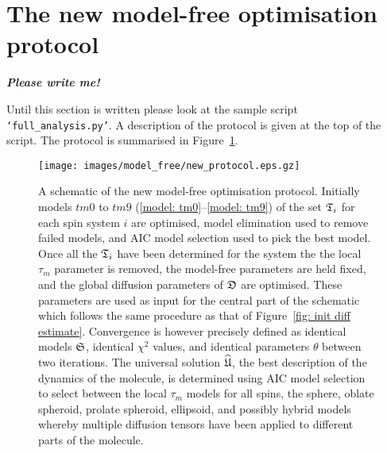 \section{The new model-free optimisation protocol}

\textbf{\textit{Please write me!}}

Until this section is written please look at the sample script \texttt{`full\_analysis.py'}.  A description of the protocol is given at the top of the script.  The protocol is summarised in Figure~\ref{fig: new protocol}.


\begin{figure}
\centerline{\texttt{[image: images/model\_free/new\_protocol.eps.gz]}}
\caption[A schematic of the new model-free optimisation protocol]{A schematic of the new model-free optimisation protocol.  Initially models $tm0$ to $tm9$ (\ref{model: tm0}--\ref{model: tm9}) of the set $\mathfrak{T}_i$ for each spin system $i$ are optimised, model elimination used to remove failed models, and AIC model selection used to pick the best model.  Once all the $\mathfrak{T}_i$ have been determined for the system the the local $\tau_m$ parameter is removed, the model-free parameters are held fixed, and the global diffusion parameters of $\mathfrak{D}$ are optimised.  These parameters are used as input for the central part of the schematic which follows the same procedure as that of Figure~\ref{fig: init diff estimate}.  Convergence is however precisely defined as identical models $\mathfrak{S}$, identical $\chi^2$ values, and identical parameters $\theta$ between two iterations.  The universal solution $\widehat{\mathfrak{U}}$, the best description of the dynamics of the molecule, is determined using AIC model selection to select between the local $\tau_m$ models for all spins, the sphere, oblate spheroid, prolate spheroid, ellipsoid, and possibly hybrid models whereby multiple diffusion tensors have been applied to different parts of the molecule.} \label{fig: new protocol}
\end{figure}
